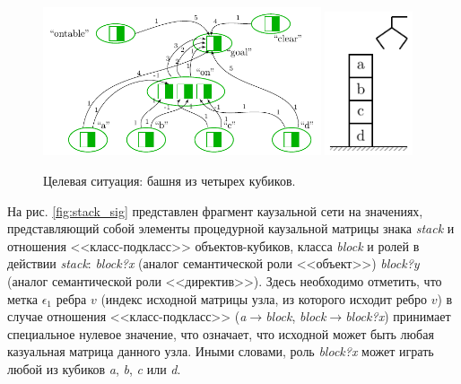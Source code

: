 \documentclass[12pt]{report}
\begin{document}
	\begin{figure}
		\centering
		\includegraphics[width=0.73\textwidth,page=1]{examples/plan/plan_nets}
		\includegraphics[width=0.23\textwidth,page=1]{examples/plan/block_world}
		\caption{Целевая ситуация: башня из четырех кубиков.}	
		\label{fig:goal_sit}	
	\end{figure}
	
	На рис. \ref{fig:stack_sig} представлен фрагмент каузальной сети на значениях, представляющий собой элементы процедурной каузальной матрицы знака \textit{stack} и отношения <<класс-подкласс>> объектов-кубиков, класса \textit{block} и ролей в действии \textit{stack}: \textit{block?x} (аналог семантической роли <<объект>>) \textit{block?y} (аналог семантической роли <<директив>>). Здесь необходимо отметить, что метка $\epsilon_1$ ребра $v$ (индекс исходной матрицы узла, из которого исходит ребро $v$) в случае отношения <<класс-подкласс>> (\textit{a}$\rightarrow$\textit{block}, \textit{block}$\rightarrow$\textit{block?x}) принимает специальное нулевое значение, что означает, что исходной может быть любая казуальная матрица данного узла. Иными словами, роль \textit{block?x} может играть любой из кубиков \textit{a}, \textit{b}, \textit{c} или \textit{d}.
	
\end{document}
